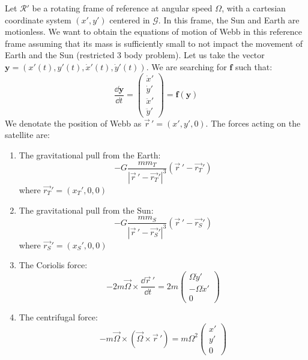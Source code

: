 Let \(\mathcal R'\) be a rotating frame of reference at angular speed \(\Omega\), with a cartesian coordinate system \((x',y')\) centered in \(\mathcal G\). In this frame, the Sun and Earth are motionless. We want to obtain the equations of motion of Webb in this reference frame assuming that its mass is sufficiently small to not impact the movement of Earth and the Sun (restricted 3 body problem). Let us take the vector \(\mathbf{y} = (x'(t), y'(t), \dot x'(t), \dot y'(t))\). We are searching for \(\mathbf{f}\) such that:
\begin{equation}
    \frac{\dd \mathbf{y}}{\dd t} = \left(\begin{matrix} \dot x' \\ \dot y' \\ \ddot x' \\ \ddot y' \end{matrix}\right) = \mathbf{f}(\mathbf{y})
\end{equation}
We denotate the position of Webb as \(\vec{r}\,' = (x', y', 0)\). The forces acting on the satellite are:
\begin{enumerate}
    \item The gravitational pull from the Earth:
    \begin{equation}
        -G \frac{m m_T}{|\vec{r}\,' - \vec{r_T}'|^3} (\vec{r}\,' - \vec{r_T}')
    \end{equation}
    where \(\vec{r_T}' = (x_T', 0, 0)\)
    \item The gravitational pull from the Sun:
    \begin{equation}
        -G \frac{m m_S}{|\vec{r}\,' - \vec{r_S}'|^3} (\vec{r}\,' - \vec{r_S}')
    \end{equation}
    where \(\vec{r_S}' = (x_S', 0, 0)\)
    \item The Coriolis force:
    \begin{equation}
        -2 m \vec\Omega \times \frac{\dd \vec{r}\,'}{\dd t} = 2 m \left(\begin{matrix} \Omega \dot y' \\ -\Omega \dot x' \\ 0 \end{matrix}\right)
        \label{eq:coriolis}
    \end{equation}
    \item The centrifugal force:
    \begin{equation}
        -m \vec\Omega \times (\vec\Omega \times \vec{r}\,') = m \Omega^2 \left(\begin{matrix} x' \\ y' \\ 0 \end{matrix}\right)
        \label{eq:centrifugal}
    \end{equation}
\end{enumerate}
